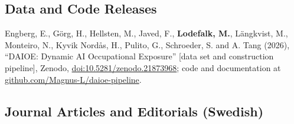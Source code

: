 \documentclass[11pt,a4paper]{article}
\newcommand{\name}[1]{\textbf{#1}}
\newcommand{\publication}[1]{\item #1}
\begin{document}
\subsection{Data and Code Releases}

\begin{enumerate}[label={[\arabic*]}]
\publication{Engberg, E., Görg, H., Hellsten, M., Javed, F., \name{Lodefalk, M.}, Längkvist, M., Monteiro, N., Kyvik Nordås, H., Pulito, G., Schroeder, S. and A. Tang (2026), ``DAIOE: Dynamic AI Occupational Exposure'' [data set and construction pipeline], Zenodo, \href{https://doi.org/10.5281/zenodo.21873968}{doi:10.5281/zenodo.21873968}; code and documentation at \href{https://github.com/Magnus-L/daioe-pipeline}{github.com/Magnus-L/daioe-pipeline}.} %
\end{enumerate}

\subsection{Journal Articles and Editorials (Swedish)}
\end{document}
